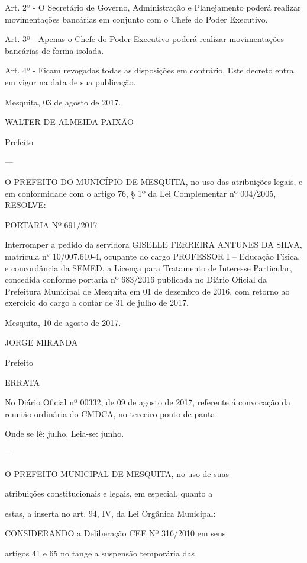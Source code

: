 \documentclass{doliberto}
\begin{document}
Art.  2º  -  O  Secretário  de  Governo,  Administração  e 
Planejamento poderá realizar movimentações bancárias em 
conjunto com o Chefe do Poder Executivo. 
 
Art. 3º - Apenas o Chefe do Poder Executivo poderá realizar 
movimentações bancárias de forma isolada. 
 
Art.  4º  -  Ficam  revogadas  todas  as  disposições  em 
contrário.  Este  decreto  entra  em  vigor  na  data  de  sua 
publicação. 

 
Mesquita, 03 de agosto de 2017. 
 

WALTER  DE ALMEIDA PAIXÃO 

Prefeito 


---

O  PREFEITO  DO  MUNICÍPIO  DE  MESQUITA,  no  uso  das 
atribuições legais, e em conformidade com o artigo 76, § 1º 
da Lei Complementar nº 004/2005, 
  RESOLVE:  
 
PORTARIA Nº 691/2017 
 
Interromper  a  pedido  da  servidora  GISELLE  FERREIRA 
ANTUNES DA SILVA, matrícula n° 10/007.610-4, ocupante 
do  cargo 
  PROFESSOR  I  –  Educação  Física,  e 
concordância da SEMED, a Licença para Tratamento de 
Interesse  Particular,  concedida  conforme  portaria  nº 
683/2016  publicada  no  Diário  Oficial  da  Prefeitura 
Municipal  de  Mesquita  em  01  de  dezembro  de  2016,  com 
retorno  ao  exercício  do  cargo  a  contar  de  31  de  julho  de 
2017. 


 
Mesquita, 10 de agosto de 2017.  

 

JORGE MIRANDA 

Prefeito 

ERRATA 
 
No  Diário  Oficial  nº  00332,  de  09  de  agosto  de  2017, 
referente á convocação da reunião ordinária do CMDCA, no 
terceiro ponto de pauta 
 
Onde se lê: julho. 
Leia-se: junho.

---

O  PREFEITO  MUNICIPAL  DE  MESQUITA,  no  uso  de  suas 

atribuições  constitucionais  e  legais,  em  especial,  quanto  a 

estas, a inserta no art. 94, IV, da Lei Orgânica Municipal: 


CONSIDERANDO a Deliberação CEE Nº 316/2010 em seus 

artigos  41  e  65  no  tange  a  suspensão  temporária  das 
\end{document}
